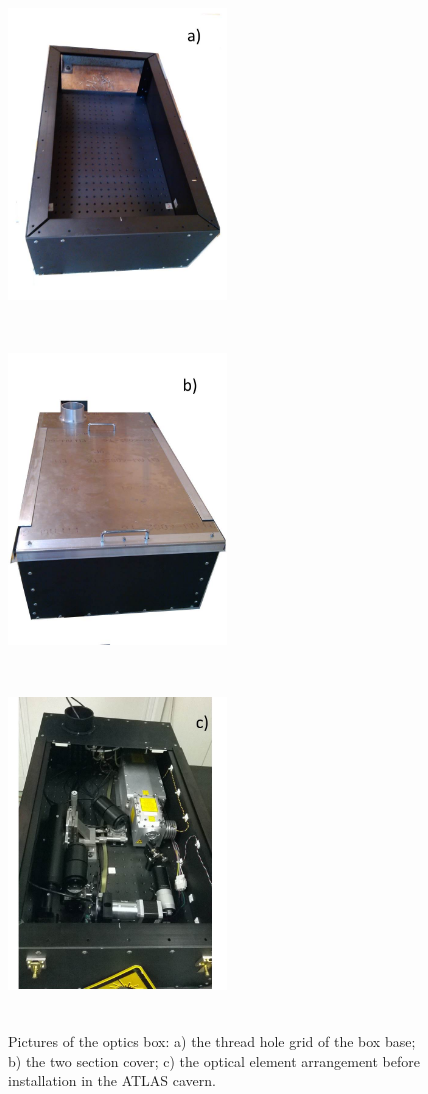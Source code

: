 \begin{figure}[htb]
\begin{center} 
\includegraphics[width=5.8cm, height=9cm]{figures/Optics_box_1}
\includegraphics[width=5.8cm, height=9cm]{figures/Optics_box_2}
\includegraphics[width=5.8cm, height=9cm]{figures/Optics_box_3}
\caption{Pictures of the optics box: a) the thread hole grid of the box base; b) the
two section cover; c) the optical element arrangement before installation in the
ATLAS cavern.  
}\label{fig:x.0}
\end{center}
\end{figure}
%

